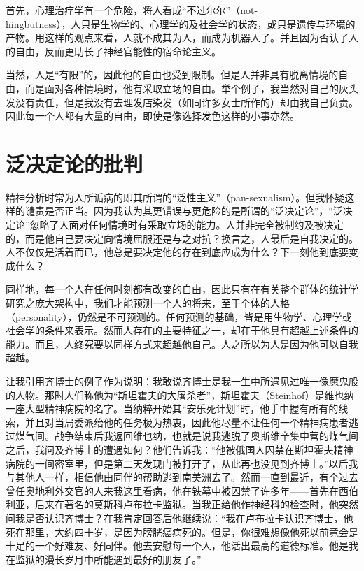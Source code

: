\documentclass[11pt,oneside]{book}
\begin{document}
\begin{common-format}
首先，心理治疗学有一个危险，将人看成“不过尔尔”（not-\\hingbutness），人只是生物学的、心理学的及社会学的状态，或只是遗传与环境的产物。用这样的观点来看，人就不成其为人，而成为机器人了。并且因为否认了人的自由，反而更助长了神经官能性的宿命论主义。

当然，人是“有限”的，因此他的自由也受到限制。但是人并非具有脱离情境的自由，而是面对各种情境时，他有采取立场的自由。举个例子，我当然对自己的灰头发没有责任，但是我没有去理发店染发（如同许多女士所作的）却由我自己负责。因此每一个人都有大量的自由，即使是像选择发色这样的小事亦然。


\section{泛决定论的批判}
精神分析时常为人所诟病的即其所谓的“泛性主义”（pan-sexualism）。但我怀疑这样的谴责是否正当。因为我认为其更错误与更危险的是所谓的“泛决定论”，“泛决定论”忽略了人面对任何情境时有采取立场的能力。人并非完全被制约及被决定的，而是他自己要决定向情境屈服还是与之对抗？换言之，人最后是自我决定的。人不仅仅是活着而已，他总是要决定他的存在到底应成为什么？下一刻他到底要变成什么？

同样地，每一个人在任何时刻都有改变的自由，因此只有在有关整个群体的统计学研究之庞大架构中，我们才能预测一个人的将来，至于个体的人格（personality），仍然是不可预测的。任何预测的基础，皆是用生物学、心理学或社会学的条件来表示。然而人存在的主要特征之一，却在于他具有超越上述条件的能力。而且，人终究要以同样方式来超越他自己。人之所以为人是因为他可以自我超越。

让我引用齐博士的例子作为说明：我敢说齐博士是我一生中所遇见过唯一像魔鬼般的人物。那时人们称他为“斯坦霍夫的大屠杀者”，斯坦霍夫（Steinhof）是维也纳一座大型精神病院的名字。当纳粹开始其“安乐死计划”时，他手中握有所有的线索，并且对当局委派绐他的任务极为热衷，因此他尽量不让任何一个精神病患者逃过煤气间。战争结束后我返回维也纳，也就是说我逃脱了奥斯维辛集中营的煤气间之后，我问及齐博士的遭遇如何？他们告诉我：“他被俄国人囚禁在斯坦霍夫精神病院的一间密室里，但是第二天发现门被打开了，从此再也没见到齐博士。”以后我与其他人一样，相信他由同伴的帮助逃到南美洲去了。然而一直到最近，有个过去曾任奥地利外交官的人来我这里看病，他在铁幕中被囚禁了许多年——首先在西伯利亚，后来在著名的莫斯科卢布拉卡监狱。当我正给他作神经科的检查时，他突然问我是否认识齐博士？在我肯定回答后他继续说：“我在卢布拉卡认识齐博士，他死在那里，大约四十岁，是因为膀胱癌病死的。但是，你很难想像他死以前竟会是十足的一个好难友、好同伴。他去安慰每一个人，他活出最高的道德标准。他是我在监狱的漫长岁月中所能遇到最好的朋友了。”


\end{common-format}
\end{document}
